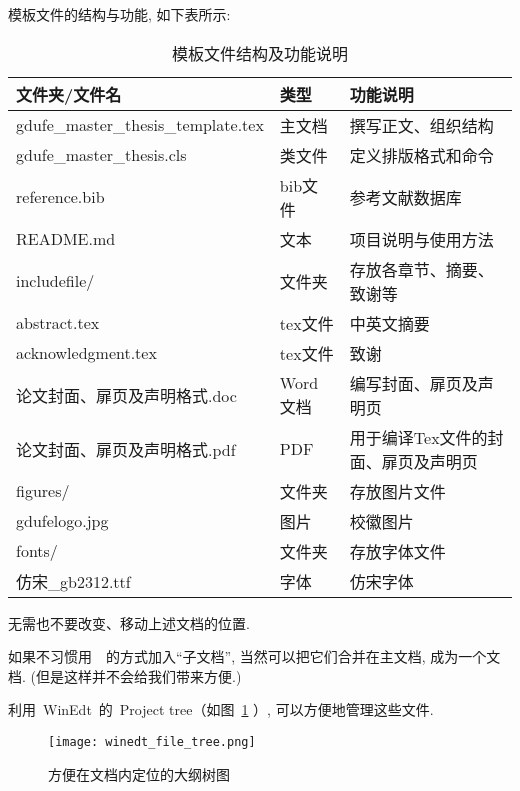 \documentclass[class = professional, oneside]{gdufe_master_thesis}
\begin{document}
模板文件的结构与功能, 如下表所示:
\begin{table}[ht]\centering
    \begin{tabular}{lll}
        \toprule
        文件夹/文件名                             & 类型     & 功能说明                \\
        \midrule
        gdufe\_master\_thesis\_template.tex & 主文档    & 撰写正文、组织结构           \\
        gdufe\_master\_thesis.cls           & 类文件    & 定义排版格式和命令           \\
        reference.bib                       & bib文件  & 参考文献数据库             \\
        README.md                           & 文本     & 项目说明与使用方法           \\
        includefile/                        & 文件夹    & 存放各章节、摘要、致谢等        \\
        \quad abstract.tex                  & tex文件  & 中英文摘要               \\
        \quad acknowledgment.tex            & tex文件  & 致谢                  \\
        \quad 论文封面、扉页及声明格式.doc              & Word文档 & 编写封面、扉页及声明页         \\
        \quad 论文封面、扉页及声明格式.pdf              & PDF    & 用于编译Tex文件的封面、扉页及声明页 \\
        figures/                            & 文件夹    & 存放图片文件              \\
        \quad gdufelogo.jpg                 & 图片     & 校徽图片                \\
        fonts/                              & 文件夹    & 存放字体文件              \\
        \quad 仿宋\_gb2312.ttf                & 字体     & 仿宋字体                \\
        \bottomrule
    \end{tabular}
    \caption{模板文件结构及功能说明}
\end{table}

无需也不要改变、移动上述文档的位置.

如果不习惯用~\verb||~的方式加入``子文档'', 当然可以把它们合并在主文档, 成为一个文档.
({\kaishu 但是这样并不会给我们带来方便.})

利用~WinEdt~的~Project tree（如图~\ref{fig:1} ）, 可以方便地管理这些文件.
\begin{figure}[h]
    \centering
    \texttt{[image: winedt\_file\_tree.png]}
    \caption{方便在文档内定位的大纲树图}
    \label{fig:1}
\end{figure}
\end{document}
